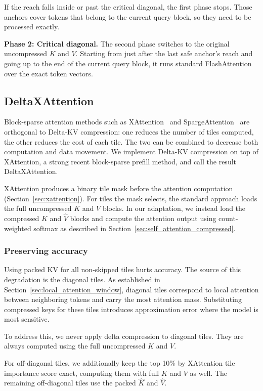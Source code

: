 If the reach falls inside or past the critical diagonal, the first phase stops. Those anchors cover tokens that belong to the current query block, so they need to be processed exactly.

\textbf{Phase 2: Critical diagonal.} The second phase switches to the original uncompressed $K$ and $V$. Starting from just after the last safe anchor's reach and going up to the end of the current query block, it runs standard FlashAttention over the exact token vectors.

\subsection{DeltaXAttention}
\label{sec:xattention_adaptation}

Block-sparse attention methods such as XAttention~\citep{xu2025xattention} and SpargeAttention~\citep{zhang2025spargeattn} are orthogonal to Delta-KV compression: one reduces the number of tiles computed, the other reduces the cost of each tile. The two can be combined to decrease both computation and data movement. We implement Delta-KV compression on top of XAttention, a strong recent block-sparse prefill method, and call the result DeltaXAttention.

XAttention produces a binary tile mask before the attention computation (Section~\ref{sec:xattention}). For tiles the mask selects, the standard approach loads the full uncompressed $K$ and $V$ blocks. In our adaptation, we instead load the compressed $\hat{K}$ and $\hat{V}$ blocks and compute the attention output using count-weighted softmax as described in Section~\ref{sec:self_attention_compressed}.
\subsubsection{Preserving accuracy}

Using packed KV for all non-skipped tiles hurts accuracy. The source of this degradation is the diagonal tiles. As established in Section~\ref{sec:local_attention_window}, diagonal tiles correspond to local attention between neighboring tokens and carry the most attention mass. Substituting compressed keys for these tiles introduces approximation error where the model is most sensitive.

To address this, we never apply delta compression to diagonal tiles. They are always computed using the full uncompressed $K$ and $V$.

For off-diagonal tiles, we additionally keep the top 10\% by XAttention tile importance score exact, computing them with full $K$ and $V$ as well. The remaining off-diagonal tiles use the packed $\hat{K}$ and $\hat{V}$.

